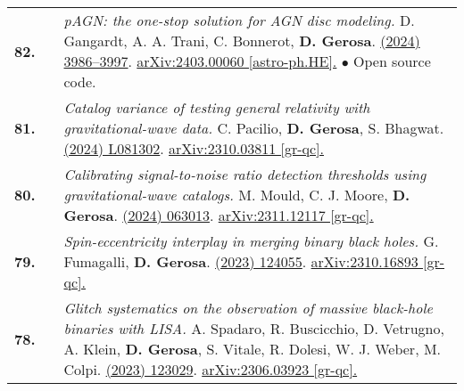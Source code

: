 {\begin{longtable}{rp{0.3cm}p{15.8cm}}
%
\textbf{82.} & & \textit{pAGN: the one-stop solution for AGN disc modeling.}
\newline{}
D. Gangardt, A. A. Trani, C. Bonnerot, \textbf{D. Gerosa}.
\newline{}
\href{https://doi.org/10.1093/mnras/stae1117}{\mnras 530 (2024) 3986–3997}. \href{https://arxiv.org/abs/2403.00060}{arXiv:2403.00060 [astro-ph.HE].}
\newline{}
\textcolor{color1}{$\bullet$} Open source code.
\vspace{0.09cm}\\
%
\textbf{81.} & & \textit{Catalog variance of testing general relativity with gravitational-wave data.}
\newline{}
C. Pacilio, \textbf{D. Gerosa}, S. Bhagwat.
\newline{}
\href{https://journals.aps.org/prd/abstract/10.1103/PhysRevD.109.L081302}{\prdl 109 (2024) L081302}. \href{https://arxiv.org/abs/2310.03811}{arXiv:2310.03811 [gr-qc].}
\vspace{0.09cm}\\
%
\textbf{80.} & & \textit{Calibrating signal-to-noise ratio detection thresholds using gravitational-wave catalogs.}
\newline{}
M. Mould, C. J. Moore, \textbf{D. Gerosa}.
\newline{}
\href{https://journals.aps.org/prd/abstract/10.1103/PhysRevD.109.063013}{\prd 109 (2024) 063013}. \href{https://arxiv.org/abs/2311.12117}{arXiv:2311.12117 [gr-qc].}
\vspace{0.09cm}\\
%
\textbf{79.} & & \textit{Spin-eccentricity interplay in merging binary black holes.}
\newline{}
G. Fumagalli, \textbf{D. Gerosa}.
\newline{}
\href{https://journals.aps.org/prd/abstract/10.1103/PhysRevD.108.124055}{\prd 108 (2023) 124055}. \href{https://arxiv.org/abs/2310.16893}{arXiv:2310.16893 [gr-qc].}
\vspace{0.09cm}\\
%
\textbf{78.} & & \textit{Glitch systematics on the observation of massive black-hole binaries with LISA.}
\newline{}
A. Spadaro, R. Buscicchio, D. Vetrugno, A. Klein, \textbf{D. Gerosa}, S. Vitale, R. Dolesi, W. J. Weber, M. Colpi.
\newline{}
\href{https://journals.aps.org/prd/abstract/10.1103/PhysRevD.108.123029}{\prd 108 (2023) 123029}. \href{https://arxiv.org/abs/2306.03923}{arXiv:2306.03923 [gr-qc].}

\end{longtable}}
